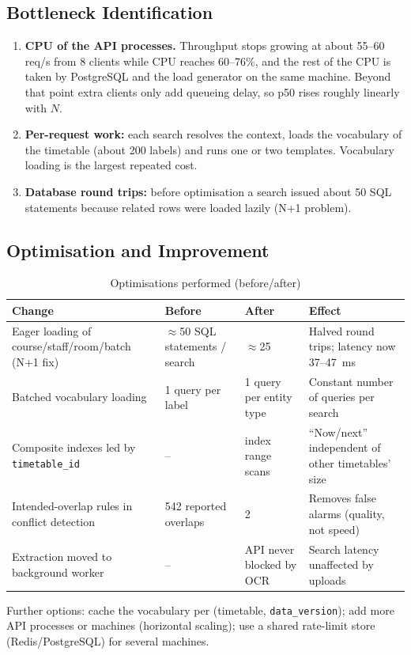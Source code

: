 \subsection{Bottleneck Identification}
\begin{enumerate}
\item \textbf{CPU of the API processes.} Throughput stops growing at about 55--60 req/s from 8 clients
      while CPU reaches 60--76\%, and the rest of the CPU is taken by PostgreSQL and the load generator
      on the same machine. Beyond that point extra clients only add queueing delay, so p50 rises
      roughly linearly with $N$.
\item \textbf{Per-request work:} each search resolves the context, loads the vocabulary of the
      timetable (about 200 labels) and runs one or two templates. Vocabulary loading is the largest
      repeated cost.
\item \textbf{Database round trips:} before optimisation a search issued about 50 SQL statements
      because related rows were loaded lazily (N+1 problem).
\end{enumerate}

\subsection{Optimisation and Improvement}
\begin{table}[H]
\centering
\caption{Optimisations performed (before/after)}
\label{tab:optim}
\small
\begin{tabularx}{\textwidth}{@{}p{4cm}p{3.2cm}p{3.2cm}X@{}}
\toprule
\textbf{Change} & \textbf{Before} & \textbf{After} & \textbf{Effect}\\
\midrule
Eager loading of course/staff/room/batch (N+1 fix) & $\approx$50 SQL statements / search & $\approx$25 & Halved round trips; latency now 37--47~ms\\
Batched vocabulary loading & 1 query per label & 1 query per entity type & Constant number of queries per search\\
Composite indexes led by \texttt{timetable\_id} & -- & index range scans & ``Now/next'' independent of other timetables' size\\
Intended-overlap rules in conflict detection & 542 reported overlaps & 2 & Removes false alarms (quality, not speed)\\
Extraction moved to background worker & -- & API never blocked by OCR & Search latency unaffected by uploads\\
\bottomrule
\end{tabularx}
\end{table}
Further options: cache the vocabulary per (timetable, \texttt{data\_version}); add more API processes
or machines (horizontal scaling); use a shared rate-limit store (Redis/PostgreSQL) for several machines.

